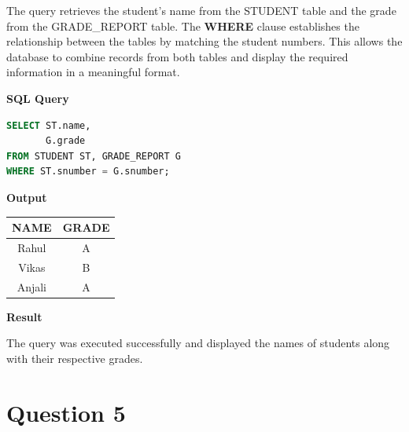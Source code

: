 \documentclass[12pt,a4paper]{report}
\begin{document}
The query retrieves the student's name from the STUDENT table and the grade from the GRADE\_REPORT table. The \textbf{WHERE} clause establishes the relationship between the tables by matching the student numbers. This allows the database to combine records from both tables and display the required information in a meaningful format.

\vspace{0.4cm}

\textbf{SQL Query}

\begin{lstlisting}[language=SQL]
SELECT ST.name,
       G.grade
FROM STUDENT ST, GRADE_REPORT G
WHERE ST.snumber = G.snumber;
\end{lstlisting}

\vspace{0.5cm}

\textbf{Output}

\vspace{0.3cm}

\begin{center}
\renewcommand{\arraystretch}{1.6}
\begin{tabular}{|c|c|}
\hline
\textbf{NAME} & \textbf{GRADE} \\
\hline
Rahul & A \\
\hline
Vikas & B \\
\hline
Anjali & A \\
\hline
\end{tabular}
\end{center}

\vspace{0.6cm}

\textbf{Result}

The query was executed successfully and displayed the names of students along with their respective grades.


\newpage


\vspace{-1cm}

\section*{Question 5}
\end{document}
